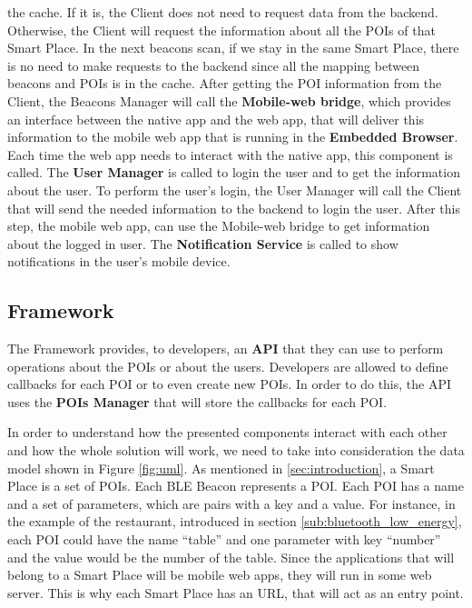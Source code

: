 the cache. If it is, the Client does not need to request
data from the backend. Otherwise, the Client will
request the information about all the POIs of that
Smart Place. In the next beacons scan, if we stay in
the same Smart Place, there is no need to make requests
to the backend since all the mapping between beacons
and POIs is in the cache.
After getting the POI information from the Client,
the Beacons Manager will call the \textbf{Mobile-web bridge},
which provides an interface between the native app
and the web app, that will deliver this information
to the mobile web app that is running in the
\textbf{Embedded Browser}. 
Each time the web app needs to interact
with the native app, this component is called.
The \textbf{User Manager} is called to login the
user and to get the information about the user. 
To perform the user's login, the User Manager
will call the Client that will send the needed information
to the backend to login the user. After this step,
the mobile web app, can use the Mobile-web bridge
to get information about the logged in user.
The \textbf{Notification Service} is called to
show notifications in the user's mobile device.

\subsection{Framework}
\label{sub:framework}
The Framework provides, to developers, an \textbf{API} that they
can use to perform operations about the POIs or about the users.
Developers are allowed to define callbacks for each POI or to
even create new POIs. In order to do this, the API
uses the \textbf{POIs Manager} that will store the callbacks
for each POI.

In order to understand how the presented components
interact with each other and how the whole solution will
work, we need to take into consideration the data model
shown in Figure \ref{fig:uml}.
As mentioned in \ref{sec:introduction}, a Smart Place
is a set of POIs. Each BLE Beacon represents a POI.
Each POI has a name and a set of parameters, which are
pairs with a key and a value.
For instance, in the example of the restaurant,
introduced in section \ref{sub:bluetooth_low_energy},
each POI could have the name ``table'' and one 
parameter with key ``number'' and the value would
be the number of the table. Since the applications
that will belong to a Smart Place will be
mobile web apps, they will run in some web
server. This is why each Smart Place has an URL,
that will act as an entry point.

